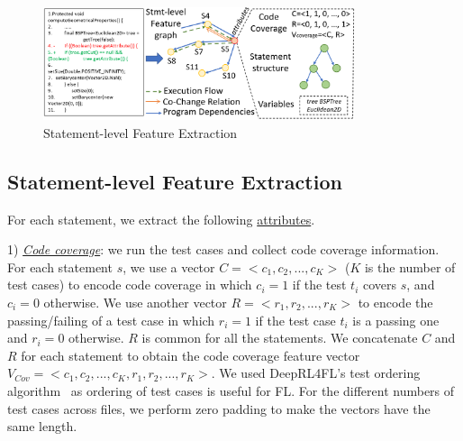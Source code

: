 
\begin{figure}[t]
	\centering
	\includegraphics[width=3.6in]{graphs/step-1-statement.png}
        \vspace{-19pt}
	\caption{Statement-level Feature Extraction}
        \vspace{-5pt}
	\label{statement-level-feature-extraction}
\end{figure}


\subsection{Statement-level Feature Extraction}

For each statement, we extract the following \underline{attributes}.

1) {\em \underline{Code coverage}}: we run the test cases and collect
code coverage information. For each statement $s$, we use a vector $C
= <c_1, c_2, ..., c_K>$ ($K$ is the number of test cases) to encode
code coverage in which $c_i=1$ if the test $t_i$ covers $s$, and
$c_i=0$ otherwise. We use another vector $R = <r_1, r_2, ..., r_K>$ to
encode the passing/failing of a test case in which $r_i=1$ if the test
case $t_i$ is a passing one and $r_i=0$ otherwise. $R$ is common for
all the statements. We concatenate $C$ and $R$ for each statement to
obtain the code coverage feature vector $V_{Cov} = <c_1, c_2, ...,
c_K, r_1, r_2, ..., r_K>$.
%
We used DeepRL4FL's test ordering algorithm~\cite{icse21-fl} as
ordering of test cases is useful for FL.
%
For the different numbers of test cases across files, we perform zero
padding to make the vectors have the same length.

